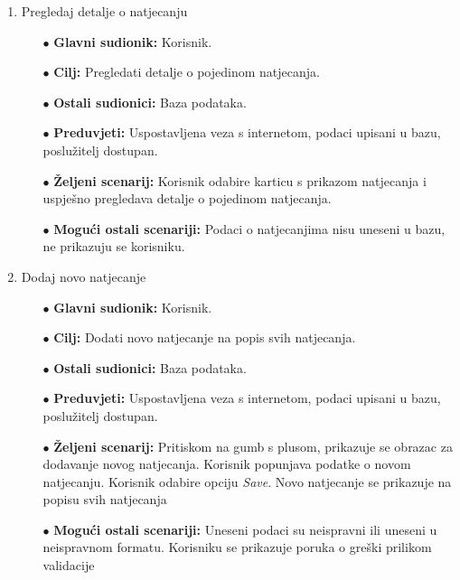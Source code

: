 \documentclass[times, utf8, zavrsni]{fer}
\begin{document}
\begin{enumerate}
    \item Pregledaj detalje o natjecanju
    \begin{itemize}
        \item[$\bullet$] \textbf{Glavni sudionik:} Korisnik.
        \item[$\bullet$] \textbf{Cilj:} Pregledati detalje o pojedinom natjecanja.
        \item[$\bullet$] \textbf{Ostali sudionici:} Baza podataka.
        \item[$\bullet$] \textbf{Preduvjeti:} Uspostavljena veza s internetom, podaci upisani u bazu, poslužitelj dostupan.
        \item[$\bullet$] \textbf{Željeni scenarij:} Korisnik odabire karticu s prikazom natjecanja i uspješno pregledava detalje o pojedinom natjecanja.
        \item[$\bullet$] \textbf{Mogući ostali scenariji:} Podaci o natjecanjima nisu uneseni u bazu, ne prikazuju se korisniku.
    \end{itemize}



    \item Dodaj novo natjecanje
    \begin{itemize}
        \item[$\bullet$] \textbf{Glavni sudionik:} Korisnik.
        \item[$\bullet$] \textbf{Cilj:} Dodati novo natjecanje na popis svih natjecanja.
        \item[$\bullet$] \textbf{Ostali sudionici:} Baza podataka.
        \item[$\bullet$] \textbf{Preduvjeti:} Uspostavljena veza s internetom, podaci upisani u bazu, poslužitelj dostupan.
        \item[$\bullet$] \textbf{Željeni scenarij:} Pritiskom na gumb s plusom, prikazuje se obrazac za dodavanje novog natjecanja. Korisnik popunjava podatke
        o novom natjecanju. Korisnik odabire opciju \textit{Save}. Novo natjecanje se prikazuje na popisu svih natjecanja
        \item[$\bullet$] \textbf{Mogući ostali scenariji:} Uneseni podaci su neispravni ili uneseni u neispravnom formatu. 
        Korisniku se prikazuje poruka o greški prilikom validacije
    \end{itemize}



\end{enumerate}
\end{document}
